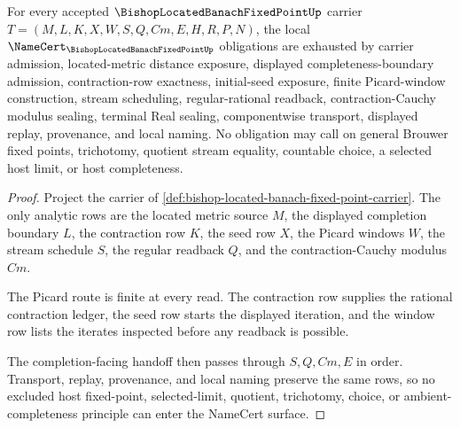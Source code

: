 \begin{theorem}
\label{thm:bishop-located-banach-fixed-point-namecert-obligations}
For every accepted $\BishopLocatedBanachFixedPointUp$ carrier $T=(M,L,K,X,W,S,Q,Cm,E,H,R,P,N)$, the local $\NameCert_{\BishopLocatedBanachFixedPointUp}$ obligations are exhausted by carrier admission, located-metric distance exposure, displayed completeness-boundary admission, contraction-row exactness, initial-seed exposure, finite Picard-window construction, stream scheduling, regular-rational readback, contraction-Cauchy modulus sealing, terminal Real sealing, componentwise transport, displayed replay, provenance, and local naming. No obligation may call on general Brouwer fixed points, trichotomy, quotient stream equality, countable choice, a selected host limit, or host completeness.
\end{theorem}
\begin{proof}
Project the carrier of \autoref{def:bishop-located-banach-fixed-point-carrier}. The only analytic rows are the located metric source $M$, the displayed completion boundary $L$, the contraction row $K$, the seed row $X$, the Picard windows $W$, the stream schedule $S$, the regular readback $Q$, and the contraction-Cauchy modulus $Cm$.

The Picard route is finite at every read. The contraction row supplies the rational contraction ledger, the seed row starts the displayed iteration, and the window row lists the iterates inspected before any readback is possible.

The completion-facing handoff then passes through $S,Q,Cm,E$ in order. Transport, replay, provenance, and local naming preserve the same rows, so no excluded host fixed-point, selected-limit, quotient, trichotomy, choice, or ambient-completeness principle can enter the NameCert surface.
\end{proof}

